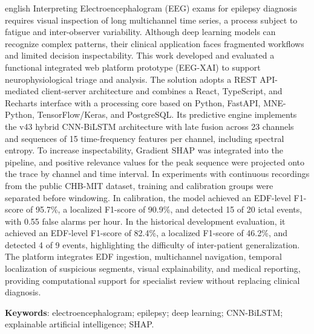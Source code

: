 \begin{resumo}[ABSTRACT]
\begin{otherlanguage*}{english}
Interpreting Electroencephalogram (EEG) exams for epilepsy diagnosis requires visual inspection of long multichannel time series, a process subject to fatigue and inter-observer variability. Although deep learning models can recognize complex patterns, their clinical application faces fragmented workflows and limited decision inspectability. This work developed and evaluated a functional integrated web platform prototype (EEG-XAI) to support neurophysiological triage and analysis. The solution adopts a REST API-mediated client-server architecture and combines a React, TypeScript, and Recharts interface with a processing core based on Python, FastAPI, MNE-Python, TensorFlow/Keras, and PostgreSQL. Its predictive engine implements the v43 hybrid CNN-BiLSTM architecture with late fusion across 23 channels and sequences of 15 time-frequency features per channel, including spectral entropy. To increase inspectability, Gradient SHAP was integrated into the pipeline, and positive relevance values for the peak sequence were projected onto the trace by channel and time interval. In experiments with continuous recordings from the public CHB-MIT dataset, training and calibration groups were separated before windowing. In calibration, the model achieved an EDF-level F1-score of 95.7\%, a localized F1-score of 90.9\%, and detected 15 of 20 ictal events, with 0.55 false alarms per hour. In the historical development evaluation, it achieved an EDF-level F1-score of 82.4\%, a localized F1-score of 46.2\%, and detected 4 of 9 events, highlighting the difficulty of inter-patient generalization. The platform integrates EDF ingestion, multichannel navigation, temporal localization of suspicious segments, visual explainability, and medical reporting, providing computational support for specialist review without replacing clinical diagnosis.

\vspace{\onelineskip}
\noindent\textbf{Keywords}: electroencephalogram; epilepsy; deep learning; CNN-BiLSTM; explainable artificial intelligence; SHAP.
\end{otherlanguage*}
\end{resumo}

\listoffigures*
\cleardoublepage
{}
\listoftables*
\cleardoublepage

